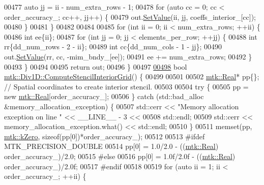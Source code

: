 \begin{DoxyCode}
{{00477     \textcolor{keyword}{auto} jj = ii - num\_extra\_rows - 1;
00478     \textcolor{keywordflow}{for} (\textcolor{keyword}{auto} cc = 0; cc < order\_accuracy\_; cc++, jj++) \{
00479       out.\hyperlink{classmtk_1_1DenseMatrix_a784ce5784109ac86bfb9d8562b334b13}{SetValue}(ii, jj, coeffs\_interior\_[cc]);
00480     \}
00481   \}
00482 
00484 
00485   \textcolor{keywordflow}{for} (\textcolor{keywordtype}{int} ii = 0; ii < num\_extra\_rows; ++ii) \{
00486     \textcolor{keywordtype}{int} ee\{ii\};
00487     \textcolor{keywordflow}{for} (\textcolor{keywordtype}{int} jj = 0; jj < elements\_per\_row; ++jj) \{
00488       \textcolor{keywordtype}{int} rr\{dd\_num\_rows - 2 - ii\};
00489       \textcolor{keywordtype}{int} cc\{dd\_num\_cols - 1 - jj\};
00490       out.\hyperlink{classmtk_1_1DenseMatrix_a784ce5784109ac86bfb9d8562b334b13}{SetValue}(rr, cc, -mim\_bndy\_[ee]);
00491       ee += num\_extra\_rows;
00492     \}
00493   \}
00494 
00495   \textcolor{keywordflow}{return} out;
00496 \}
00497 
\hypertarget{mtk__div__1d_8cc_source_l00498}{}\hyperlink{classmtk_1_1Div1D_a3eb3a32862a6b066cd583cbbd00a6509}{00498} \textcolor{keywordtype}{bool} \hyperlink{classmtk_1_1Div1D_a3eb3a32862a6b066cd583cbbd00a6509}{mtk::Div1D::ComputeStencilInteriorGrid}() \{
00499 
00501 
00502   \hyperlink{group__c01-roots_gac080bbbf5cbb5502c9f00405f894857d}{mtk::Real}* pp\{\}; \textcolor{comment}{// Spatial coordinates to create interior stencil.}
00503 
00504   \textcolor{keywordflow}{try} \{
00505     pp = \textcolor{keyword}{new} \hyperlink{group__c01-roots_gac080bbbf5cbb5502c9f00405f894857d}{mtk::Real}[order\_accuracy\_];
00506   \} \textcolor{keywordflow}{catch} (std::bad\_alloc &memory\_allocation\_exception) \{
00507     std::cerr << \textcolor{stringliteral}{"Memory allocation exception on line "} << \_\_LINE\_\_ - 3 <<
00508       std::endl;
00509     std::cerr << memory\_allocation\_exception.what() << std::endl;
00510   \}
00511   memset(pp, \hyperlink{group__c01-roots_ga59a451a5fae30d59649bcda274fea271}{mtk::kZero}, \textcolor{keyword}{sizeof}(pp[0])*order\_accuracy\_);
00512 
00513 \textcolor{preprocessor}{  #ifdef MTK\_PRECISION\_DOUBLE}
00514   pp[0] = 1.0/2.0 - ((\hyperlink{group__c01-roots_gac080bbbf5cbb5502c9f00405f894857d}{mtk::Real}) order\_accuracy\_)/2.0;
00515 \textcolor{preprocessor}{  #else}
00516   pp[0] = 1.0f/2.0f - ((\hyperlink{group__c01-roots_gac080bbbf5cbb5502c9f00405f894857d}{mtk::Real}) order\_accuracy\_)/2.0f;
00517 \textcolor{preprocessor}{  #endif}
00518 
00519   \textcolor{keywordflow}{for} (\textcolor{keyword}{auto} ii = 1; ii < order\_accuracy\_; ++ii) \{
}}
\end{DoxyCode}
